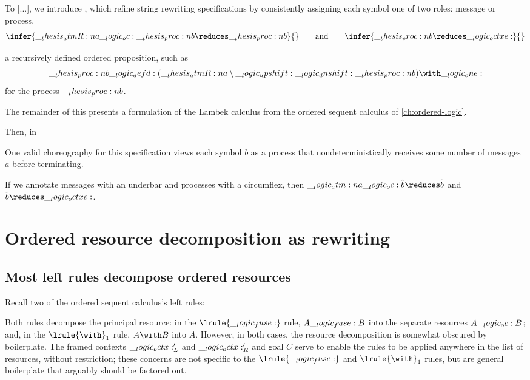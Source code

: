 To [...], we introduce , which refine string rewriting specifications by consistently assigning each symbol one of two roles: message or process.
\begin{equation*}
  \infer{\atmR{a} \oc \proc{b} \reduces \proc{b}}{}
  \qquad\text{and}\qquad
  \infer{\proc{b} \reduces \octxe}{}
\end{equation*}

a recursively defined ordered proposition, such as
\begin{equation*}
  \proc{b} \defd (\atmR{a} \limp \up \dn \proc{b}) \with \one
\end{equation*}
for the process $\__thesis_proc:n {b}$.

The remainder of this  presents a formulation of the Lambek calculus from the ordered sequent calculus of \cref{ch:ordered-logic}.

Then, in 


One valid choreography for this specification views each symbol $b$ as a process that nondeterministically receives some number of messages $a$ before terminating.

If we annotate messages with an underbar and processes with a circumflex, then $\atm{a} \oc \hat{b} \reduces \hat{b}$ and $\hat{b} \reduces \octxe$.


\section{Ordered resource decomposition as rewriting}

\subsection{Most left rules decompose ordered resources}

Recall two of the ordered sequent calculus's left rules:
Both rules decompose the principal resource: in the $\lrule{\fuse}$ rule, $A \__logic_fuse: B$ into the separate resources $A \__logic_oc: B$; and, in the $\lrule{\with}_1$ rule, $A \with B$ into $A$.
However, in both cases, the resource decomposition is somewhat obscured by boilerplate.
The framed contexts $\__logic_octx:'_L$ and $\__logic_octx:'_R$ and goal $C$ serve to enable the rules to be applied anywhere in the list of resources, without restriction;
these concerns are not specific to the $\lrule{\fuse}$ and $\lrule{\with}_1$ rules, but are general boilerplate that arguably should be factored out.

